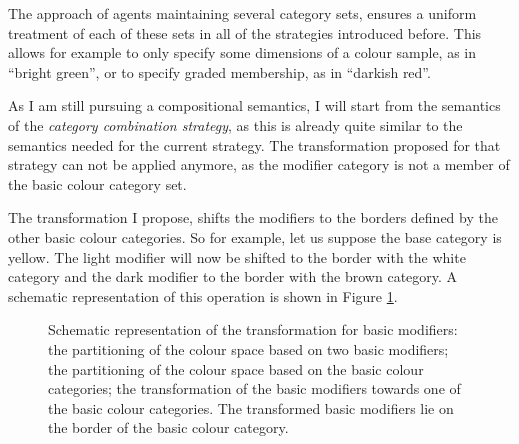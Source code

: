 The approach of agents maintaining several category sets, ensures a
uniform treatment of each of these sets in all of the strategies
introduced before. This allows for example to only specify some
dimensions of a colour sample, as in ``bright green'', or to specify
graded membership, as in ``darkish red''.

As I am still pursuing a compositional semantics, I will start from
the semantics of the \emph{category combination strategy}, as this is
already quite similar to the semantics needed for the current
strategy. The transformation proposed for that strategy can not be
applied anymore, as the modifier category is not a member of the basic
colour category set.

The transformation I propose, shifts the modifiers to the borders
defined by the other basic colour categories. So for example, let us
suppose the base category is yellow. The light modifier will now be
shifted to the border with the white category and the dark modifier to
the border with the brown category. A schematic representation of this
operation is shown in Figure \ref{f:ams-semantics-schematic}.

\begin{figure}
\centering
{}
\caption[Schematic representation of the transformation for basic
modifiers]{Schematic representation of the transformation for
  basic modifiers:  the
  partitioning of the colour space based on two basic modifiers;
   the partitioning of the
  colour space based on the basic colour categories;
   the transformation
  of the basic modifiers towards one of the basic colour
  categories. The transformed basic modifiers lie on the border
 of the basic colour category.}
\label{f:ams-semantics-schematic}
\end{figure}


